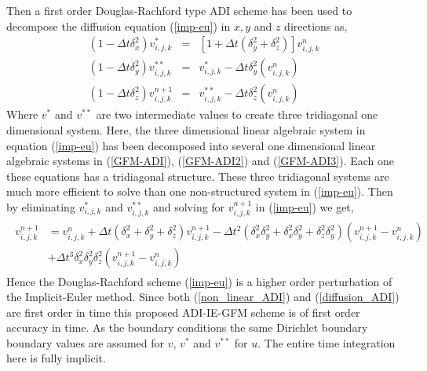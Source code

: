 Then a first order Douglas-Rachford type ADI scheme has been used to decompose the diffusion equation (\ref{imp-eu}) in $x,y$ and $z$ directions as,  
\begin{eqnarray}
		\left(1- \Delta t \delta_x^2\right)v_{i,j,k}^{*}&=&\left[1+ \Delta t \left(\delta_y^2+\delta_z^2 \right)\right]v_{i,j,k}^{n}\label{GFM-ADI}\\
		\left(1-\Delta t \delta_y^2\right)v_{i,j,k}^{**}&=&v_{i,j,k}^{*}- \Delta t \delta_y^2\left(v_{i,j,k}^{n}\right)\label{GFM-ADI2}\\
		\left(1- \Delta t \delta_z^2\right)v_{i,j,k}^{n+1}&=&v_{i,j,k}^{**}- \Delta t \delta_z^2\left(v_{i,j,k}^{n}\right)\label{GFM-ADI3}
\end{eqnarray} 
Where $v^*$ and $v^{**}$ are two intermediate values to create three tridiagonal one dimensional system. Here, the three dimensional linear algebraic system in equation (\ref{imp-eu}) has been decomposed into several one dimensional linear algebraic systems in (\ref{GFM-ADI}), (\ref{GFM-ADI2}) and (\ref{GFM-ADI3}).  Each one these equations has a tridiagonal structure. These three tridiagonal systems are much more efficient to solve than one non-structured system in (\ref{imp-eu}). Then by eliminating $v^*_{i,j,k}$ and $v^{**}_{i,j,k}$ and solving for $v^{n+1}_{i,j,k}$ in (\ref{imp-eu}) we get,
\begin{eqnarray}
\begin{aligned}
	v^{n+1}_{i,j,k}&=v^n_{i,j,k}+ \Delta t \left(\delta_x^2+\delta_y^2+\delta_z^2\right) v^{n+1}_{i,j,k} -\Delta t^2 \left(\delta_x^2\delta_y^2+\delta_x^2\delta_y^2+\delta_z^2\delta_y^2\right)(v^{n+1}_{i,j,k}-v^{n}_{i,j,k})\\
	&+ \Delta t^3 \delta_x^2\delta_y^2\delta_z^2(v^{n+1}_{i,j,k}-v^{n}_{i,j,k}) \label{adi_tailor}
	\end{aligned}
\end{eqnarray}
Hence the Douglas-Rachford scheme (\ref{imp-eu}) is a higher order perturbation of the Implicit-Euler method. Since both (\ref{non_linear_ADI}) and (\ref{diffusion_ADI}) are first order in time this proposed ADI-IE-GFM scheme is of first order accuracy in time. As the boundary conditions the same Dirichlet boundary boundary values are assumed for $v$, $v^*$ and  $v^{**}$ for $u$. The entire time integration here is fully implicit. 
